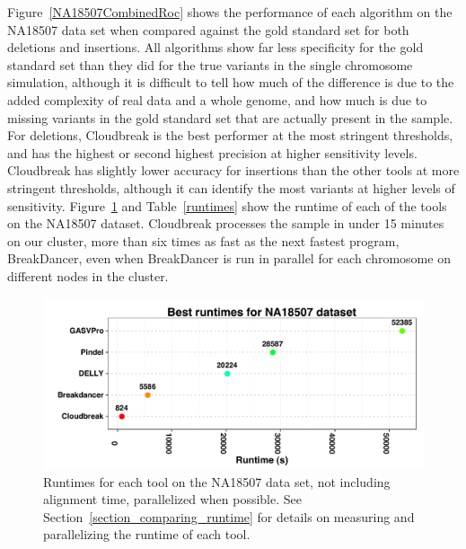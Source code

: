 Figure~\ref{NA18507CombinedRoc} shows the performance of each algorithm on the NA18507 data set when compared against the gold standard set for both deletions and insertions. All algorithms show far less specificity for the gold standard set than they did for the true variants in the single chromosome simulation, although it is difficult to tell how much of the difference is due to the added complexity of real data and a whole genome, and how much is due to missing variants in the gold standard set that are actually present in the sample. For deletions, Cloudbreak is the best performer at the most stringent thresholds, and has the highest or second highest precision at higher sensitivity levels. Cloudbreak has slightly lower accuracy for insertions than the other tools at more stringent thresholds, although it can identify the most variants at higher levels of sensitivity. Figure~\ref{NA18507BestRuntimes} and Table~\ref{runtimes} show the runtime of each of the tools on the NA18507 dataset. Cloudbreak processes the sample in under 15 minutes on our cluster, more than six times as fast as the next fastest program, BreakDancer, even when BreakDancer is run in parallel for each chromosome on different nodes in the cluster.

\begin{figure}
\centering
\includegraphics[width=1\textwidth]{figures/NA18507BestRuntimes_horizontal.pdf}
\caption{Runtimes for each tool on the NA18507 data set, not including alignment time, parallelized when possible. See Section~\ref{section_comparing_runtime} for details on measuring and parallelizing the runtime of each tool.}
\label{NA18507BestRuntimes}
\end{figure}

